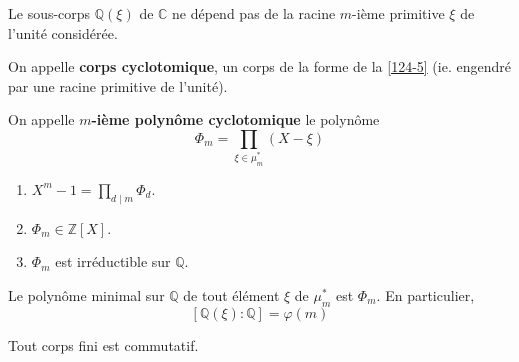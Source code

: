 	\begin{proposition}
		\label{125-4}
		Le sous-corps $\mathbb{Q}(\xi)$ de $\mathbb{C}$ ne dépend pas de la racine $m$-ième primitive $\xi$ de l'unité considérée.
	\end{proposition}
	
	\begin{definition}
		On appelle \textbf{corps cyclotomique}, un corps de la forme de la \cref{124-5} (ie. engendré par une racine primitive de l'unité).
	\end{definition}
	
	\begin{definition}
		On appelle \textbf{$m$-ième polynôme cyclotomique} le polynôme
		\[ \Phi_m = \prod_{\xi \in \mu_m^*} (X - \xi) \]
	\end{definition}
	
	\begin{theorem}
		\begin{enumerate}
			\item $X^m - 1 = \prod_{d \mid m} \Phi_d$.
			\item $\Phi_m \in \mathbb{Z}[X]$.
			\item $\Phi_m$ est irréductible sur $\mathbb{Q}$.
		\end{enumerate}
	\end{theorem}
	
	\begin{corollary}
		Le polynôme minimal sur $\mathbb{Q}$ de tout élément $\xi$ de $\mu_m^*$ est $\Phi_m$. En particulier,
		\[ [\mathbb{Q}(\xi):\mathbb{Q}]=\varphi(m) \]
	\end{corollary}
	
	\begin{application}
		Tout corps fini est commutatif.
	\end{application}

